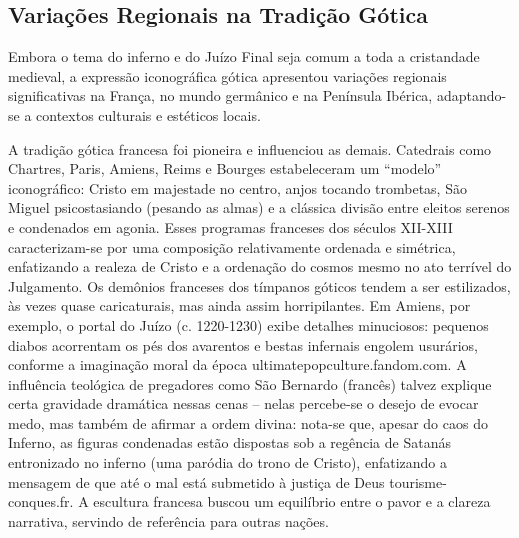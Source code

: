 \subsection{Variações Regionais na Tradição Gótica}

Embora o tema do inferno e do Juízo Final seja comum a toda a cristandade medieval, a expressão iconográfica gótica apresentou variações regionais significativas na França, no mundo germânico e na Península Ibérica, adaptando-se a contextos culturais e estéticos locais.

A tradição gótica francesa foi pioneira e influenciou as demais. Catedrais como Chartres, Paris, Amiens, Reims e Bourges estabeleceram um “modelo” iconográfico: Cristo em majestade no centro, anjos tocando trombetas, São Miguel psicostasiando (pesando as almas) e a clássica divisão entre eleitos serenos e condenados em agonia. Esses programas franceses dos séculos XII-XIII caracterizam-se por uma composição relativamente ordenada e simétrica, enfatizando a realeza de Cristo e a ordenação do cosmos mesmo no ato terrível do Julgamento. Os demônios franceses dos tímpanos góticos tendem a ser estilizados, às vezes quase caricaturais, mas ainda assim horripilantes. Em Amiens, por exemplo, o portal do Juízo (c. 1220-1230) exibe detalhes minuciosos: pequenos diabos acorrentam os pés dos avarentos e bestas infernais engolem usurários, conforme a imaginação moral da época ultimatepopculture.fandom.com. A influência teológica de pregadores como São Bernardo (francês) talvez explique certa gravidade dramática nessas cenas -- nelas percebe-se o desejo de evocar medo, mas também de afirmar a ordem divina: nota-se que, apesar do caos do Inferno, as figuras condenadas estão dispostas sob a regência de Satanás entronizado no inferno (uma paródia do trono de Cristo), enfatizando a mensagem de que até o mal está submetido à justiça de Deus tourisme-conques.fr. A escultura francesa buscou um equilíbrio entre o pavor e a clareza narrativa, servindo de referência para outras nações.

